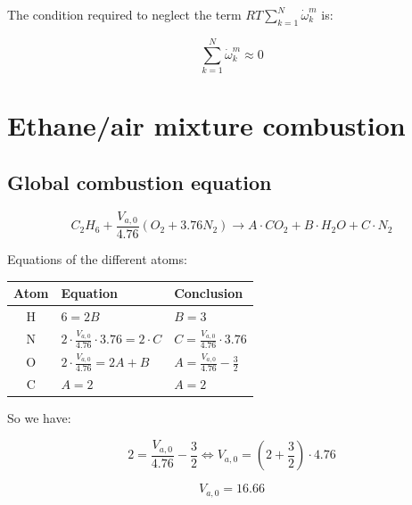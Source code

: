 \documentclass[11pt, a4paper]{article} %
\begin{document}
The condition required to neglect the term $RT \sum_{k=1}^{N} \dot{\omega}_k^m$ is:

\begin{equation}
    \sum_{k=1}^{N} \dot{\omega}_k^m \approx 0
\end{equation}


\section{Ethane/air mixture combustion}

\subsection{Global combustion equation}

\begin{equation}
    C_2H_6 + \frac{V_{a,0}}{4.76} \left( O_2 + 3.76 N_2 \right) \rightarrow A \cdot CO_2 + B \cdot H_2O + C \cdot N_2
\end{equation}

Equations of the different atoms:

\renewcommand{\arraystretch}{1.5}

\begin{center}
    \begin{tabular}{|c|>{\centering\arraybackslash}m{4cm}|>{\centering\arraybackslash}m{5cm}|}
        \hline
        Atom & Equation & Conclusion \\
        \hline
        H & $6 = 2B$ & $B = 3$ \\
        \hline
        N & $2 \cdot \frac{V_{a,0}}{4.76} \cdot 3.76 = 2 \cdot C$ & $C = \frac{V_{a,0}}{4.76} \cdot 3.76$ \\
        \hline
        O & $2 \cdot \frac{V_{a,0}}{4.76} = 2A + B$ & $A = \frac{V_{a,0}}{4.76} - \frac{3}{2}$ \\
        \hline
        C & $A = 2$ & $A = 2$ \\
        \hline
    \end{tabular}
\end{center}

So we have:

\begin{equation}
    2 = \frac{V_{a,0}}{4.76} - \frac{3}{2} \iff V_{a,0} = \left( 2 + \frac{3}{2} \right) \cdot 4.76
\end{equation}

\begin{equation}
    \boxed{
        V_{a,0} = 16.66
    }
\end{equation}
\end{document}
